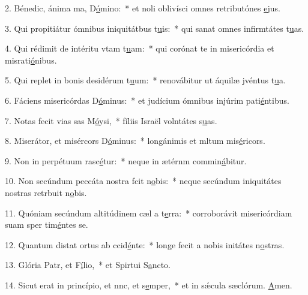 2. Bénedic, ánima ma, D\uline{ó}mino:~* et noli oblivísci omnes retributónes \uline{e}jus.\par 
3. Qui propitiátur ómnibus iniquitátbus t\uline{u}is:~* qui sanat omnes infirmtátes t\uline{u}as.\par 
4. Qui rédimit de intéritu vtam t\uline{u}am:~* qui corónat te in misericórdia et misrati\uline{ó}nibus.\par 
5. Qui replet in bonis desidérum t\uline{u}um:~* renovábitur ut áquilæ jvéntus t\uline{u}a.\par 
6. Fáciens misericórdas D\uline{ó}minus:~* et judícium ómnibus injúrim pati\uline{é}ntibus.\par 
7. Notas fecit vias sas M\uline{ó}ysi,~* fíliis Israël volntátes s\uline{u}as.\par 
8. Miserátor, et misércors D\uline{ó}minus:~* longánimis et mltum mis\uline{é}ricors.\par 
9. Non in perpétuum rasc\uline{é}tur:~* neque in ætérnm commin\uline{á}bitur.\par 
10. Non secúndum peccáta nostra fcit n\uline{o}bis:~* neque secúndum iniquitátes nostras retrbuit n\uline{o}bis.\par 
11. Quóniam secúndum altitúdinem cæl a t\uline{e}rra:~* corroborávit misericórdiam suam sper tim\uline{é}ntes se.\par 
12. Quantum distat ortus ab ccid\uline{é}nte:~* longe fecit a nobis initátes n\uline{o}stras.\par 
13. Glória Patr, et F\uline{í}lio,~* et Spirtui S\uline{a}ncto.\par 
14. Sicut erat in princípio, et nnc, et s\uline{e}mper,~* et in sǽcula sæclórum. \uline{A}men.\par 
